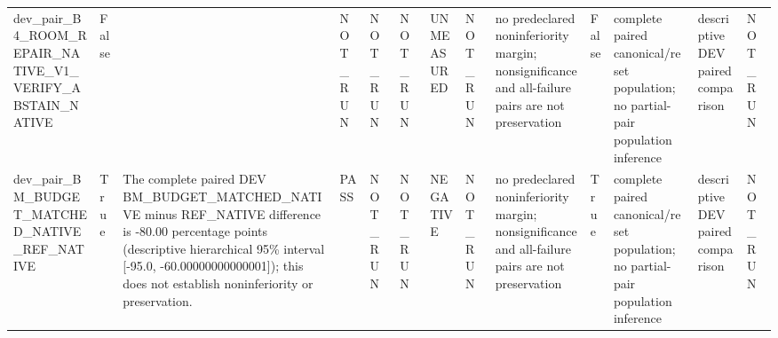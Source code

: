 \begin{tabular}{lllllllllllll}
dev\_pair\_B4\_ROOM\_REPAIR\_NATIVE\_V1\_VERIFY\_ABSTAIN\_NATIVE & False &  & NOT\_RUN & NOT\_RUN & NOT\_RUN & UNMEASURED & NOT\_RUN & no predeclared noninferiority margin; nonsignificance and all-failure pairs are not preservation & False & complete paired canonical/reset population; no partial-pair population inference & descriptive DEV paired comparison & NOT\_RUN \\
dev\_pair\_BM\_BUDGET\_MATCHED\_NATIVE\_REF\_NATIVE & True & The complete paired DEV BM\_BUDGET\_MATCHED\_NATIVE minus REF\_NATIVE difference is -80.00 percentage points (descriptive hierarchical 95\% interval [-95.0, -60.00000000000001]); this does not establish noninferiority or preservation. & PASS & NOT\_RUN & NOT\_RUN & NEGATIVE & NOT\_RUN & no predeclared noninferiority margin; nonsignificance and all-failure pairs are not preservation & True & complete paired canonical/reset population; no partial-pair population inference & descriptive DEV paired comparison & NOT\_RUN \\
\end{tabular}
